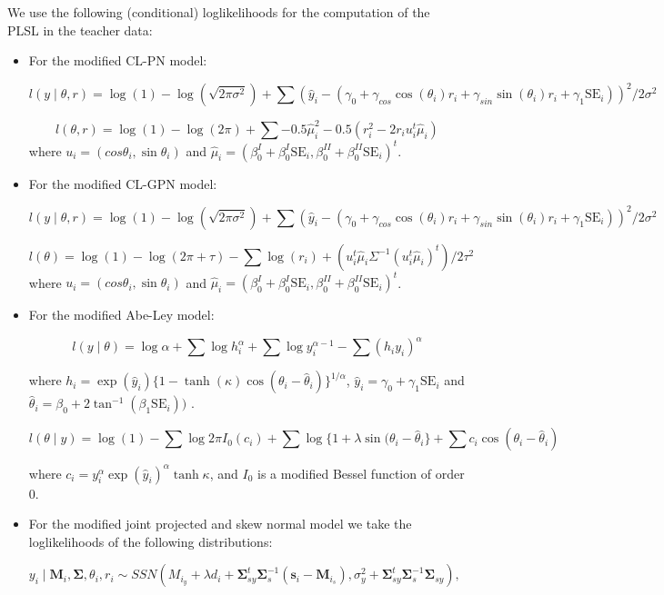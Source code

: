 \documentclass[12pt,]{article}
\begin{document}
\indent We use the following (conditional) loglikelihoods for the
computation of the PLSL in the teacher data:

\begin{itemize}
\item For the modified CL-PN model:

$$l(y \mid \theta, r) = \log(1) - \log(\sqrt{2\pi\sigma^2}) + \sum(\hat{y}_i-(\gamma_0 + \gamma_{cos}\cos(\theta_i)r_i +
\gamma_{sin}\sin(\theta_i)r_i + \gamma_1\text{SE}_i))^2/2\sigma^2$$

$$l(\theta, r) = \log(1) - \log(2\pi) + \sum -0.5\hat{\mu}_i^2 - 0.5(r_i^2 - 2r_iu_i^t\hat{\mu}_i)$$
where $u_i = (cos\theta_i, \sin \theta_i)$ and $\hat{\mu}_i = (\beta_0^{I} + \beta_0^{I}\text{SE}_i, \beta_0^{II} + \beta_0^{II}\text{SE}_i)^t$.

\item For the modified CL-GPN model:

$$l(y \mid \theta, r) = \log(1) - \log(\sqrt{2\pi\sigma^2}) + \sum(\hat{y}_i-(\gamma_0 + \gamma_{cos}\cos(\theta_i)r_i +
\gamma_{sin}\sin(\theta_i)r_i + \gamma_1\text{SE}_i))^2/2\sigma^2$$

$$l(\theta) =  \log(1) - \log(2\pi+\tau) - \sum \log(r_i) + (u_i^t\hat{\mu}_i\Sigma^{-1}(u_i^t\hat{\mu}_i)^t)/2\tau^2$$
where $u_i = (cos\theta_i, \sin \theta_i)$ and $\hat{\mu}_i = (\beta_0^{I} + \beta_0^{I}\text{SE}_i, \beta_0^{II} + \beta_0^{II}\text{SE}_i)^t$.


\item For the modified Abe-Ley model:


$$l(y \mid \theta) = \log\alpha + \sum\log h_i^\alpha + \sum\log y_i^{\alpha - 1} - \sum(h_iy_i)^\alpha$$

where $h_i = \exp(\hat{y}_i)\{1-\tanh(\kappa)\cos(\theta_i - \hat{\theta}_i)\}^{1/\alpha}$, $\hat{y}_i = \gamma_0 + \gamma_1\text{SE}_i$ and $\hat{\theta}_i = \beta_0 +  2\tan^{-1}(\beta_1\text{SE}_i))$ .

$$l(\theta \mid y) = \log(1) - \sum\log 2\pi I_0(c_i) + \sum\log\{1 + \lambda \sin(\theta_i - \hat{\theta}_i\} + \sum c_i\cos(\theta_i - \hat{\theta}_i)$$

where $c_i = y_i^{\alpha}\exp(\hat{y}_i)^{\alpha}\tanh\kappa$, and $I_{0}$ is a modified Bessel function of order $0$.


\item For the modified joint projected and skew normal model we take the loglikelihoods of the following distributions:

$y_i \mid \boldsymbol{M}_i, \boldsymbol{\Sigma}, \theta_i, r_i \sim SSN(M_{i_y} + \lambda d_i + \boldsymbol{\Sigma}_{sy}^t\boldsymbol{\Sigma}_s^{-1}(\boldsymbol{s}_i - \boldsymbol{M}_{i_s}), \sigma^2_y + \boldsymbol{\Sigma}_{sy}^t\boldsymbol{\Sigma}_s^{-1}\boldsymbol{\Sigma}_{sy}),$


\end{itemize}
\end{document}
